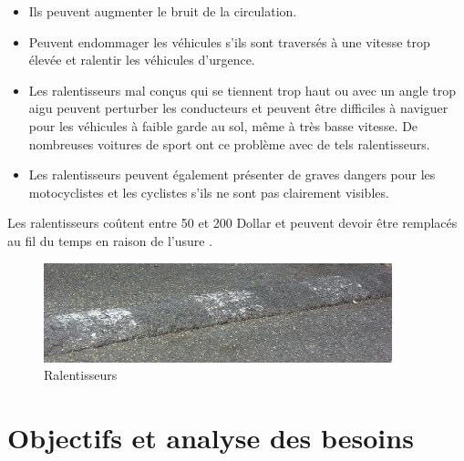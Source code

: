 \renewcommand{\labelitemi}{$\bullet$}
\begin{itemize}
  \item Ils peuvent augmenter le bruit de la circulation.
  \item Peuvent endommager les véhicules s'ils sont traversés à une vitesse trop élevée et ralentir les véhicules d'urgence.
  \item Les ralentisseurs mal conçus qui se tiennent trop haut ou avec un angle
        trop aigu peuvent perturber les conducteurs et peuvent être difficiles à naviguer pour les véhicules à faible garde au sol,
        même à très basse vitesse. De nombreuses voitures de sport ont ce problème avec de tels ralentisseurs.
  \item Les ralentisseurs peuvent également présenter de graves dangers pour les motocyclistes et les cyclistes s'ils ne sont pas clairement visibles.
\end{itemize}

Les ralentisseurs coûtent entre 50 et 200 Dollar et peuvent devoir être remplacés au fil du temps
en raison de l'usure \cite{SpeedBump2020}.

\begin{figure}[h!]
  \center
  \includegraphics[width=0.9\textwidth]{Images/chapter1/Speedbump.jpg}
  \caption{Ralentisseurs}
\end{figure}

\section{Objectifs et analyse des besoins}

